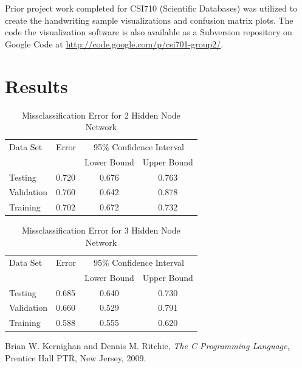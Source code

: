 \documentclass{article}
\begin{document}
Prior project work completed for CSI710 (Scientific Databases) was utilized to create the handwriting sample visualizations and confusion matrix plots. The code the visualization software is also available as a Subversion repository on Google Code at \url{http://code.google.com/p/csi701-group2/}.

\section{Results}\label{Results}

\begin{table}
\caption{Missclassification Error for 2 Hidden Node Network}
\begin{center}
\begin{tabular}{llcc}
\toprule
Data Set & Error & \multicolumn{2}{c}{95\% Confidence Interval} \\
\cmidrule(r){3-4}
& & Lower Bound & Upper Bound \\
\midrule
Testing       & 0.720 &  0.676 & 0.763  \\
Validation    & 0.760 &  0.642 & 0.878  \\
Training      & 0.702 &  0.672 & 0.732  \\
\bottomrule
\end{tabular}
\label{table2}
\end{center}
\end{table}

\begin{table}
\caption{Missclassification Error for 3 Hidden Node Network}
\begin{center}
\begin{tabular}{llcc}
\toprule
Data Set & Error & \multicolumn{2}{c}{95\% Confidence Interval} \\
\cmidrule(r){3-4}
& & Lower Bound & Upper Bound \\
\midrule
Testing       & 0.685 &  0.640 & 0.730  \\
Validation    & 0.660 &  0.529 & 0.791  \\
Training      & 0.588 &  0.555 & 0.620  \\
\bottomrule
\end{tabular}
\label{table3}
\end{center}
\end{table}


\begin{thebibliography}{9}

  Brian W. Kernighan and Dennis M. Ritchie,
  \emph{The C Programming Language},
  Prentice Hall PTR, New Jersey,
  2009.

\end{thebibliography}
\end{document}
